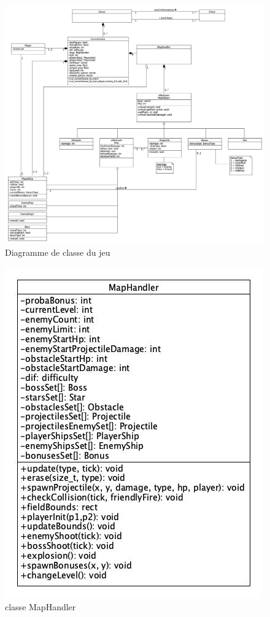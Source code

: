\documentclass[a4paper,12pt]{article}
\begin{document}
\begin{figure}
\centering
\includegraphics[scale=0.3]{images/newGameClassDiagram.jpg}
\caption{Diagramme de classe du jeu}
\end{figure}

\begin{figure}
\centering
\includegraphics[scale=0.3]{images/mapHandlerDiagram.jpg}
\caption{classe MapHandler}
\end{figure}
\newpage
\end{document}
